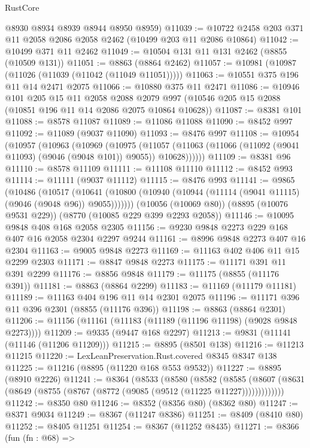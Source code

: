 \begin{lexlean}{RustCore}
\begin{coremodule}
      @8930
      @8934
      @8939
      @8944
      @8950
      @8959)
@11039 := @10722 @2458 @203 @371 @11 @2058 @2086 @2058 @2462 (@10499 @203 @11 @2086 @10864)
@11042 := @10499 @371 @11 @2462
@11049 := @10504 @131 @11 @131 @2462 (@8855 (@10509 @131))
@11051 := @8863 (@8864 @2462)
@11057 := @10981 (@10987 (@11026 (@11039 (@11042 (@11049 @11051)))))
@11063 := @10551 @375 @196 @11 @14 @2471 @2075
@11066 := @10880 @375 @11 @2471
@11086 := @10946
    @101
    @205
    @15
    @11
    @2058
    @2088
    @2079
    @997
    (@10546 @205 @15 @2088 (@10851 @196 @11 @14 @2086 @2075 @10864 @10628))
@11087 := @8381 @101
@11088 := @8578 @11087
@11089 := @11086 @11088
@11090 := @8452 @997
@11092 := @11089 (@9037 @11090)
@11093 := @8476 @997
@11108 := @10954
    (@10957
      (@10963
        (@10969
          (@10975
            (@11057 (@11063 (@11066 (@11092 (@9041 @11093) (@9046 (@9048 @101)) @9055)) @10628))))))
@11109 := @8381 @96
@11110 := @8578 @11109
@11111 := @11108 @11110
@11112 := @8452 @993
@11114 := @11111 (@9037 @11112)
@11115 := @8476 @993
@11141 := @9865
    (@10486
      (@10517
        (@10641 (@10800 (@10940 (@10944 (@11114 (@9041 @11115) (@9046 (@9048 @96)) @9055)))))))
    (@10056 (@10069 @80))
    (@8895 (@10076 @9531 @229))
    (@8770 (@10085 @229 @399 @2293 @2058))
@11146 := @10095 @9848 @408 @168 @2058 @2305
@11156 := @9230 @9848 @2273 @229 @168 @407 @16 @2058 @2304 @2297 @9244
@11161 := @8996 @9848 @2273 @407 @16 @2304
@11163 := @9005 @9848 @2273
@11169 := @11163 @402 @406 @11 @15 @2299 @2303
@11171 := @8847 @9848 @2273
@11175 := @11171 @391 @11 @391 @2299
@11176 := @8856 @9848
@11179 := @11175 (@8855 (@11176 @391))
@11181 := @8863 (@8864 @2299)
@11183 := @11169 (@11179 @11181)
@11189 := @11163 @404 @196 @11 @14 @2301 @2075
@11196 := @11171 @396 @11 @396 @2301 (@8855 (@11176 @396))
@11198 := @8863 (@8864 @2301)
@11206 := @11156 (@11161 (@11183 (@11189 (@11196 @11198) (@9028 @9848 @2273))))
@11209 := @9335 (@9447 @168 @2297)
@11213 := @9831 (@11141 (@11146 (@11206 @11209)))
@11215 := @8895 (@8501 @138)
@11216 := @11213 @11215
@11220 := LexLeanPreservation.Rust.covered @8345 @8347 @138
@11225 := @11216 (@8895 (@11220 @168 @553 @9532))
@11227 := @8895 (@8910 @2226)
@11241 := @8364
    (@8533
      (@8580
        (@8582
          (@8585 (@8607 (@8631 (@8649 (@8755 (@8767 (@8772 (@9085 (@9512 (@11225 @11227)))))))))))))
@11242 := @8350 @80
@11246 := @8352 (@8356 @80) (@8362 @80)
@11247 := @8371 @9034
@11249 := @8367 (@11247 @8386)
@11251 := @8409 (@8410 @80)
@11252 := @8405 @11251
@11254 := @8367 (@11252 @8435)
@11271 := @8366
    (fun (fn : @68) =>

\end{coremodule}
\end{lexlean}
